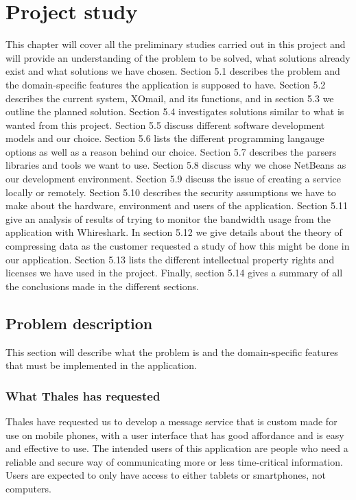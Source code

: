 \chapter{Project study}

This chapter will cover all the preliminary studies carried out in this project and will provide an understanding of the problem to be solved, what solutions already exist and what solutions we have chosen. Section 5.1 describes the problem and the domain-specific features the application is supposed to have. Section 5.2 describes the current system, XOmail, and its functions, and in section 5.3 we outline the planned solution. Section 5.4 investigates solutions similar to what is wanted from this project. Section 5.5 discuss different software development models and our choice. Section 5.6 lists the different programming langauge options as well as a reason behind our choice. Section 5.7 describes the parsers libraries and tools we want to use. Section 5.8 discuss why we chose NetBeans as our development environment. Section 5.9 discuss the issue of creating a service locally or remotely. Section 5.10 describes the security assumptions we have to make about the hardware, environment and users of the application. Section 5.11 give an analysis of results of trying to monitor the bandwidth usage from the application with Whireshark. In section 5.12 we  give details about the theory of compressing data as the customer requested a study of how this might be done in our application. Section 5.13 lists the different intellectual property rights and licenses we have used in the project. Finally, section 5.14 gives a summary of all the conclusions made in the different sections.

\section{Problem description}

This section will describe what the problem is and the domain-specific features that must be implemented in the application.

\subsection{What Thales has requested}
Thales have requested us to develop a message service that is custom made for use on mobile phones, with a user interface that has good affordance and is easy and effective to use.
\newline
\newline
The intended users of this application are people who need a reliable and secure way of communicating more or less time-critical information. Users are expected to only have access to either tablets or smartphones, not computers.

